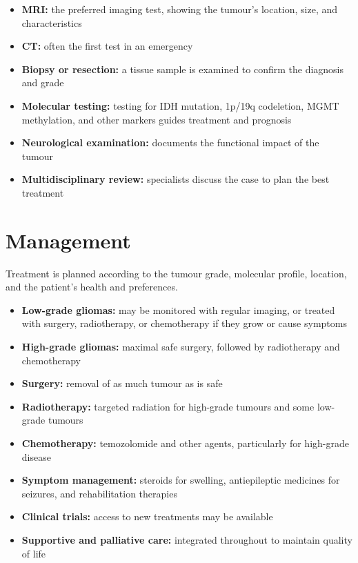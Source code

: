 \begin{itemize}
    \item \textbf{MRI:} the preferred imaging test, showing the tumour's location, size, and characteristics
    \item \textbf{CT:} often the first test in an emergency
    \item \textbf{Biopsy or resection:} a tissue sample is examined to confirm the diagnosis and grade
    \item \textbf{Molecular testing:} testing for IDH mutation, 1p/19q codeletion, MGMT methylation, and other markers guides treatment and prognosis
    \item \textbf{Neurological examination:} documents the functional impact of the tumour
    \item \textbf{Multidisciplinary review:} specialists discuss the case to plan the best treatment
\end{itemize}

\section*{Management}
Treatment is planned according to the tumour grade, molecular profile, location, and the patient's health and preferences.

\begin{itemize}
    \item \textbf{Low-grade gliomas:} may be monitored with regular imaging, or treated with surgery, radiotherapy, or chemotherapy if they grow or cause symptoms
    \item \textbf{High-grade gliomas:} maximal safe surgery, followed by radiotherapy and chemotherapy
    \item \textbf{Surgery:} removal of as much tumour as is safe
    \item \textbf{Radiotherapy:} targeted radiation for high-grade tumours and some low-grade tumours
    \item \textbf{Chemotherapy:} temozolomide and other agents, particularly for high-grade disease
    \item \textbf{Symptom management:} steroids for swelling, antiepileptic medicines for seizures, and rehabilitation therapies
    \item \textbf{Clinical trials:} access to new treatments may be available
    \item \textbf{Supportive and palliative care:} integrated throughout to maintain quality of life
\end{itemize}

